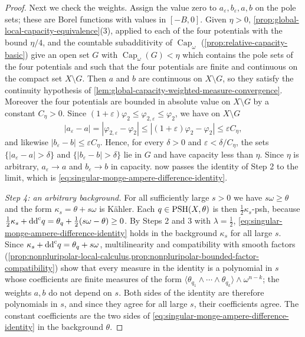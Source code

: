 \begin{proof}
Next we check the weights. Assign the value zero to $a_\varepsilon,b_\varepsilon,a,b$ on the pole sets; these are Borel functions with values in $[-B,0]$. Given $\eta>0$, \cref{prop:global-local-capacity-equivalence}(3), applied to each of the four potentials with the bound $\eta/4$, and the countable subadditivity of $\operatorname{Cap}_\omega$ (\cref{prop:relative-capacity-basic}) give an open set $G$ with $\operatorname{Cap}_\omega(G)<\eta$ which contains the pole sets of the four potentials and such that the four potentials are finite and continuous on the compact set $X\setminus G$. Then $a$ and $b$ are continuous on $X\setminus G$, so they satisfy the continuity hypothesis of \cref{lem:global-capacity-weighted-measure-convergence}. Moreover the four potentials are bounded in absolute value on $X\setminus G$ by a constant $C_\eta>0$. Since $(1+\varepsilon)\varphi_2\leq\varphi_{2,\varepsilon}\leq\varphi_2$, we have on $X\setminus G$
\[
 |a_\varepsilon-a|=|\varphi_{2,\varepsilon}-\varphi_2|\leq|(1+\varepsilon)\varphi_2-\varphi_2|\leq\varepsilon C_\eta,
\]
and likewise $|b_\varepsilon-b|\leq\varepsilon C_\eta$. Hence, for every $\delta>0$ and $\varepsilon<\delta/C_\eta$, the sets $\{|a_\varepsilon-a|>\delta\}$ and $\{|b_\varepsilon-b|>\delta\}$ lie in $G$ and have capacity less than $\eta$. Since $\eta$ is arbitrary, $a_\varepsilon\to a$ and $b_\varepsilon\to b$ in capacity.  now passes the identity of Step 2 to the limit, which is \eqref{eq:singular-monge-ampere-difference-identity}.

\emph{Step 4: an arbitrary background.} For all sufficiently large $s>0$ we have $s\omega\geq\theta$ and the form $\kappa_s=\theta+s\omega$ is K\"ahler. Each $q\in\mathrm{PSH}(X,\theta)$ is then $\tfrac12\kappa_s$-psh, because $\tfrac12\kappa_s+\mathrm{dd}^{\mathrm{c}} q=\theta_q+\tfrac12(s\omega-\theta)\geq0$. By Steps 2 and 3 with $\lambda=\frac12$, \eqref{eq:singular-monge-ampere-difference-identity} holds in the background $\kappa_s$ for all large $s$. Since $\kappa_s+\mathrm{dd}^{\mathrm{c}} q=\theta_q+s\omega$, multilinearity and compatibility with smooth factors (\cref{prop:nonpluripolar-local-calculus,prop:nonpluripolar-bounded-factor-compatibility}) show that every measure in the identity is a polynomial in $s$ whose coefficients are finite measures of the form $\langle\theta_{q_1}\wedge\cdots\wedge\theta_{q_k}\rangle\wedge\omega^{n-k}$; the weights $a,b$ do not depend on $s$. Both sides of the identity are therefore polynomials in $s$, and since they agree for all large $s$, their coefficients agree. The constant coefficients are the two sides of \eqref{eq:singular-monge-ampere-difference-identity} in the background $\theta$.
\end{proof}

